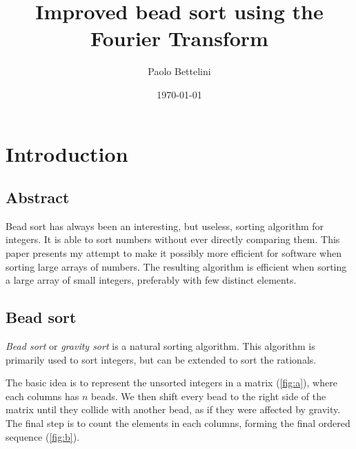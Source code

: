 \documentclass{article}
\title{Improved bead sort using the Fourier Transform}
\author{Paolo Bettelini}
\date{\today}
\begin{document}
\maketitle

\section{Introduction}

\subsection{Abstract}

Bead sort has always been an interesting, but useless, sorting algorithm
for integers. It is able to sort numbers without ever directly comparing them.
This paper presents my attempt to make it possibly more efficient
for software when sorting large arrays of numbers.
The resulting algorithm is efficient when sorting a large array of small integers,
preferably with few distinct elements.

\subsection{Bead sort}

\textit{Bead sort}\cite{beadsort} or \textit{gravity sort}
is a natural sorting algorithm.
This algorithm is primarily used to sort
integers, but can be extended to sort the rationals.

The basic idea is to represent the unsorted integers
in a matrix (\ref{fig:a}), where each columns has \(n\) beads.
We then shift every bead to the right side of the matrix
until they collide with another bead,
as if they were affected by gravity.
The final step is to count the elements in each columns,
forming the final ordered sequence (\ref{fig:b}).
\end{document}
